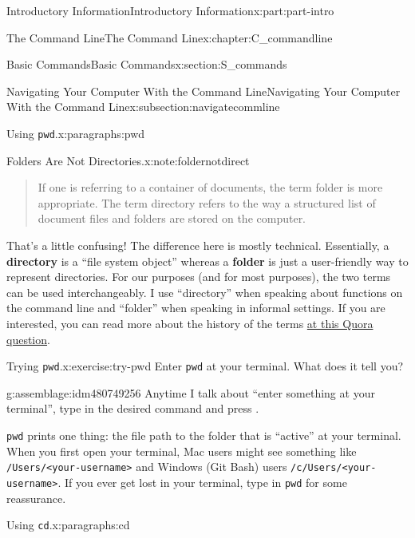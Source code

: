 \documentclass[oneside,10pt,]{book}
\newcommand{\mono}[1]{\texttt{#1}}
\newcommand{\terminology}[1]{\textbf{#1}}
\newcommand{\kbd}[1]{\keys{{#1}}}
\begin{document}
\begin{partptx}{Introductory Information}{}{Introductory Information}{}{}{x:part:part-intro}
\begin{chapterptx}{The Command Line}{}{The Command Line}{}{}{x:chapter:C_commandline}
\begin{sectionptx}{Basic Commands}{}{Basic Commands}{}{}{x:section:S_commands}
\begin{subsectionptx}{Navigating Your Computer With the Command Line}{}{Navigating Your Computer With the Command Line}{}{}{x:subsection:navigatecommline}
\begin{paragraphs}{Using \mono{pwd}.}{x:paragraphs:pwd}
\begin{note}{Folders Are Not Directories.}{x:note:foldernotdirect}
\begin{quote}
If one is referring to a container of documents, the term folder is more appropriate. The term directory refers to the way a structured list of document files and folders are stored on the computer.\end{quote}
 That's a little confusing! The difference here is mostly technical. Essentially, a \terminology{directory} is a ``file system object'' whereas a \terminology{folder} is just a user-friendly way to represent directories. For our purposes (and for most purposes), the two terms can be used interchangeably. I use ``directory'' when speaking about functions on the command line and ``folder'' when speaking in informal settings. If you are interested, you can read more about the history of the terms \href{https://www.quora.com/What-is-the-difference-between-a-folder-and-a-directory}{at this Quora question}\footnotemark{}.%
\end{note}
%
%
%
\begin{inlineexercise}{Trying \mono{pwd}.}{x:exercise:try-pwd}%
Enter \mono{pwd} at your terminal. What does it tell you?%
\end{inlineexercise}%
\begin{assemblage}{}{g:assemblage:idm480749256}%
Anytime I talk about ``enter something at your terminal'', type in the desired command and press \kbd{Enter}.%
\end{assemblage}
\mono{pwd} prints one thing: the file path to the folder that is ``active'' at your terminal. When you first open your terminal, Mac users might see something like \mono{/Users/<your-username>} and Windows (Git Bash) users \mono{/c/Users/<your-username>}. If you ever get lost in your terminal, type in \mono{pwd} for some reassurance.%
\end{paragraphs}%
\begin{paragraphs}{Using \mono{cd}.}{x:paragraphs:cd}%
\index{\mono{cd}}%
%
%
%
\index{command line!\mono{cd}}%

\end{paragraphs}
\end{subsectionptx}
\end{sectionptx}
\end{chapterptx}
\end{partptx}
\end{document}
